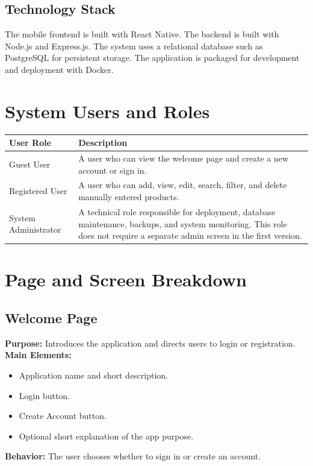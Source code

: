 \documentclass[12pt]{article}
\begin{document}
\subsection{Technology Stack}
The mobile frontend is built with React Native. The backend is built with Node.js and Express.js. The system uses a relational database such as PostgreSQL for persistent storage. The application is packaged for development and deployment with Docker.

\section{System Users and Roles}

\begin{longtable}{|p{}|p{}|}
\hline
\textbf{User Role} & \textbf{Description} \\
\hline
Guest User & A user who can view the welcome page and create a new account or sign in. \\
\hline
Registered User & A user who can add, view, edit, search, filter, and delete manually entered products. \\
\hline
System Administrator & A technical role responsible for deployment, database maintenance, backups, and system monitoring. This role does not require a separate admin screen in the first version. \\
\hline
\end{longtable}

\section{Page and Screen Breakdown}

\subsection{Welcome Page}
\textbf{Purpose:} Introduces the application and directs users to login or registration.\\
\textbf{Main Elements:}
\begin{itemize}[leftmargin=*]
    \item Application name and short description.
    \item Login button.
    \item Create Account button.
    \item Optional short explanation of the app purpose.
\end{itemize}
\textbf{Behavior:} The user chooses whether to sign in or create an account.
\end{document}
